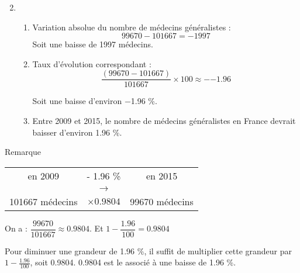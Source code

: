 \documentclass[xcolor={dvipsnames}]{beamer}
\begin{document}
\begin{frame}{}

\begin{enumerate}%
	\setcounter{enumi}{1}
	\item \begin{enumerate}[a]
		\item Variation absolue du nombre de médecins généralistes :\pause
		\begin{equation*}
		\num{99670} - \num{101667} = \num{-1997}
		\end{equation*}
		Soit une baisse de \num{1997} médecins.\pause
		
		\vspace*{0.25cm}
		\item Taux d'évolution correspondant :\pause
		\begin{equation*}
		\dfrac{(\num{99670} - \num{101667})}{\num{101667}}\times 100 \approx -\num{-1.96}
		\end{equation*}
		
		Soit une baisse d'environ \num{-1.96} \%. \pause
		\vspace*{0.25cm}
		\item Entre \num{2009} et \num{2015}, le nombre de médecins généralistes en France devrait baisser d'environ \num{1.96} \%.
		
		
		
		
	\end{enumerate}
\end{enumerate}
\end{frame}


\begin{frame}
\begin{block}{Remarque}
	\begin{center}
		\begin{tabular}{|ccc|}
		\hline
		en \num{2009} & - \num{1.96} \%  & en \num{2015} \\
		& {\LARGE $\rightarrow$} &			\\
		\num{101667} médecins& $\times \num{0.9804}$ & \num{99670} médecins \\
		\hline
	\end{tabular}
	\end{center}
	
	On a : $\dfrac{99670}{101667} \approx \num{0.9804}$.
	Et $1 - \dfrac{\num{1.96}}{\num{100}} = \num{0.9804}$
	
	\vspace*{0.5cm} 
	Pour diminuer une grandeur de \num{1.96} \%, il suffit de multiplier cette grandeur par $1 - \frac{\num{1.96}}{\num{100}}$, soit \num{0.9804}. \num{0.9804} est le  associé à une baisse de \num{1.96} \%.
\end{block}
\end{frame}
\end{document}
